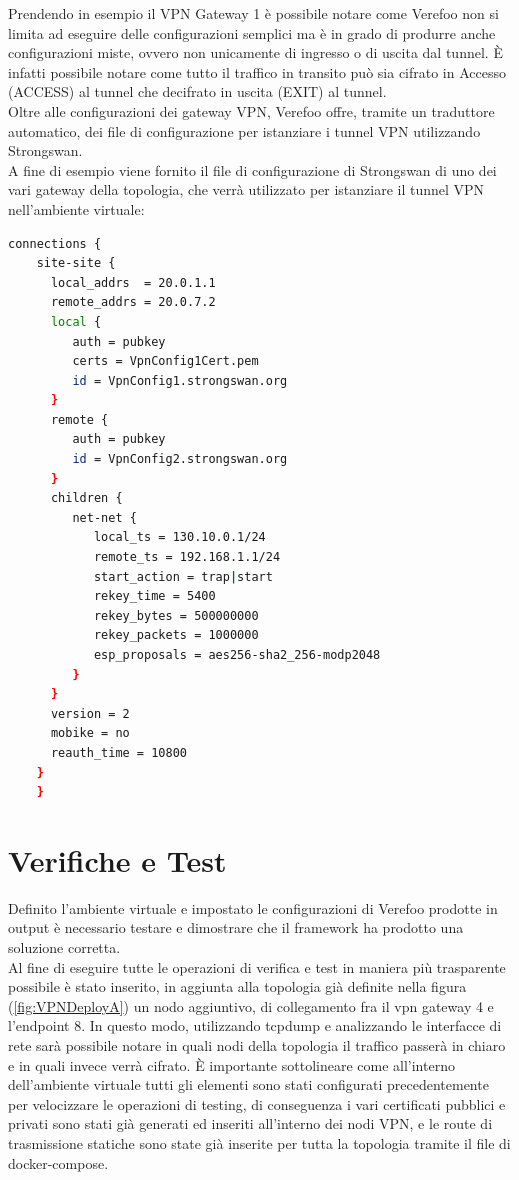 Prendendo in esempio il VPN Gateway 1 è possibile notare come Verefoo non si limita ad eseguire delle configurazioni semplici ma è in grado di produrre anche configurazioni miste, ovvero non unicamente di ingresso o di uscita dal tunnel. 
È infatti possibile notare come tutto il traffico in transito può sia cifrato in Accesso (ACCESS) al tunnel che decifrato in uscita (EXIT) al tunnel.\\
Oltre alle configurazioni dei gateway VPN, Verefoo offre, tramite un traduttore automatico, dei file di configurazione per istanziare i tunnel VPN utilizzando Strongswan.\\
A fine di esempio viene fornito il file di configurazione di Strongswan di uno dei vari gateway della topologia, che verrà utilizzato per istanziare il tunnel VPN nell'ambiente virtuale:\\


\begin{lstlisting}[language=sh]
    connections {
    site-site {
      local_addrs  = 20.0.1.1
      remote_addrs = 20.0.7.2
      local {
         auth = pubkey
         certs = VpnConfig1Cert.pem
         id = VpnConfig1.strongswan.org
      }
      remote {
         auth = pubkey
         id = VpnConfig2.strongswan.org
      }
      children {
         net-net {
            local_ts = 130.10.0.1/24            
            remote_ts = 192.168.1.1/24            
            start_action = trap|start 
            rekey_time = 5400
            rekey_bytes = 500000000
            rekey_packets = 1000000
            esp_proposals = aes256-sha2_256-modp2048
         }
      }
      version = 2
      mobike = no
      reauth_time = 10800
    }
    }
\end{lstlisting}

\section{Verifiche e Test}
Definito l'ambiente virtuale e impostato le configurazioni di Verefoo prodotte in output è necessario testare e dimostrare che il framework ha prodotto una soluzione corretta.\\
Al fine di eseguire tutte le operazioni di verifica e test in maniera più trasparente possibile è stato inserito, in aggiunta alla topologia già definite nella figura (\ref{fig:VPNDeployA})
un nodo aggiuntivo, di collegamento fra il vpn gateway 4 e l'endpoint 8. 
In questo modo, utilizzando tcpdump e analizzando le interfacce di rete sarà possibile notare in quali nodi della topologia il traffico passerà in chiaro e in quali invece verrà cifrato. 
È importante sottolineare come all'interno dell'ambiente virtuale tutti gli elementi sono stati configurati precedentemente per velocizzare le operazioni di testing, di conseguenza i vari certificati pubblici e privati sono stati già generati ed inseriti all'interno dei nodi VPN, e le route di trasmissione statiche sono state già inserite per tutta la topologia tramite il file di docker-compose.\\


